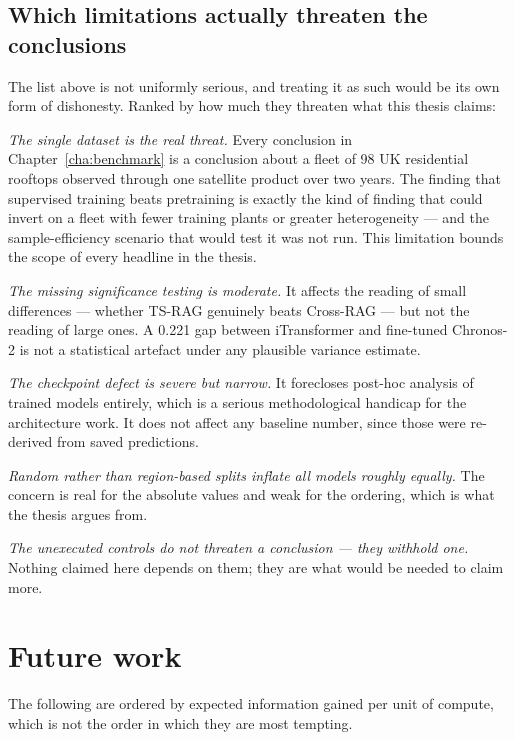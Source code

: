 \subsection{Which limitations actually threaten the conclusions}

The list above is not uniformly serious, and treating it as such would be its own form of
dishonesty. Ranked by how much they threaten what this thesis claims:

\emph{The single dataset is the real threat.} Every conclusion in
Chapter~\ref{cha:benchmark} is a conclusion about a fleet of 98 UK residential rooftops
observed through one satellite product over two years. The finding that supervised training
beats pretraining is exactly the kind of finding that could invert on a fleet with fewer
training plants or greater heterogeneity --- and the sample-efficiency scenario that would
test it was not run. This limitation bounds the scope of every headline in the thesis.

\emph{The missing significance testing is moderate.} It affects the reading of small
differences --- whether TS-RAG genuinely beats Cross-RAG --- but not the reading of large
ones. A 0.221 gap between iTransformer and fine-tuned Chronos-2 is not a statistical artefact
under any plausible variance estimate.

\emph{The checkpoint defect is severe but narrow.} It forecloses post-hoc analysis of trained
models entirely, which is a serious methodological handicap for the architecture work. It
does not affect any baseline number, since those were re-derived from saved predictions.

\emph{Random rather than region-based splits inflate all models roughly equally.} The concern
is real for the absolute values and weak for the ordering, which is what the thesis argues
from.

\emph{The unexecuted controls do not threaten a conclusion --- they withhold one.} Nothing
claimed here depends on them; they are what would be needed to claim more.

\section{Future work}
\label{sec:future}

The following are ordered by expected information gained per unit of compute, which is not
the order in which they are most tempting.


